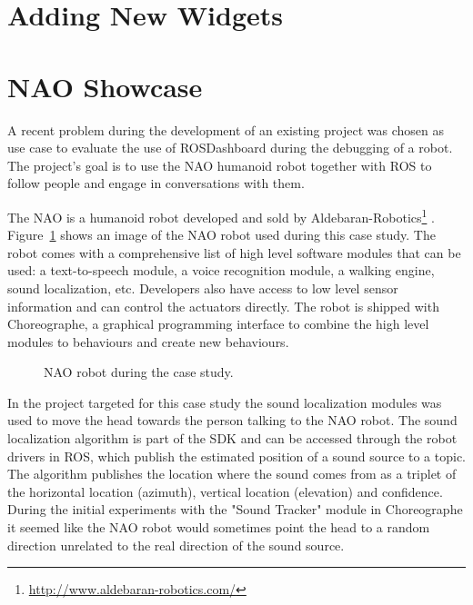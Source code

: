 \section{Adding New Widgets}

\section{NAO Showcase}
A recent problem during the development of an existing project was chosen as use case  to evaluate \q the use of ROSDashboard during the debugging of a robot. The project's goal is to use the NAO humanoid robot together with ROS to follow people and engage in conversations with them.

The NAO is a humanoid robot developed and sold by Aldebaran-Robotics\footnote{\url{http://www.aldebaran-robotics.com/}} \cite{Gouaillier2008}. Figure~\ref{nao_coffee} shows an image of the NAO robot used during this case study. The robot comes with a comprehensive list of high level software modules that can be used: a text-to-speech module, a voice recognition module, a walking engine, sound localization, etc. Developers also have access to low level sensor information and can control the actuators directly. The robot is shipped with Choreographe, a graphical programming interface to combine the high level modules to behaviours and create new behaviours.

\begin{figure}[htpb]
  \centering
  \caption{NAO robot during the case study.}
  \label{nao_coffee}
\end{figure}

In the project targeted for this case study the sound localization modules was used to move the head towards the person talking to the NAO robot. The sound localization algorithm is part of the SDK and can be accessed through the robot drivers in ROS, which publish the estimated position of a sound source to a topic. The algorithm publishes the location where the sound comes from as a triplet of the horizontal location (azimuth), vertical location (elevation) and confidence. During the initial experiments with the "Sound Tracker" module in Choreographe it seemed like the NAO robot would sometimes point the head to a random direction unrelated to the real direction of the sound source.

